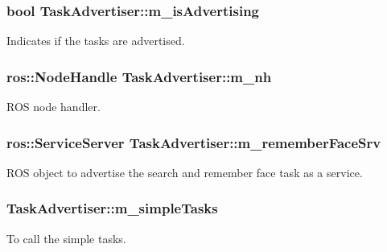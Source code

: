 \subsubsection[{\texorpdfstring{m\+\_\+is\+Advertising}{m_isAdvertising}}]{\setlength{\rightskip}{0pt plus 5cm}bool Task\+Advertiser\+::m\+\_\+is\+Advertising\hspace{0.3cm}{\ttfamily [private]}}\hypertarget{class_task_advertiser_a399c52352a5d0663074e03ad6ecae4c3}{}\label{class_task_advertiser_a399c52352a5d0663074e03ad6ecae4c3}
Indicates if the tasks are advertised. 
\subsubsection[{\texorpdfstring{m\+\_\+nh}{m_nh}}]{\setlength{\rightskip}{0pt plus 5cm}ros\+::\+Node\+Handle Task\+Advertiser\+::m\+\_\+nh\hspace{0.3cm}{\ttfamily [private]}}\hypertarget{class_task_advertiser_ac2b3e206897a243a661863c27fcf7e96}{}\label{class_task_advertiser_ac2b3e206897a243a661863c27fcf7e96}
R\+OS node handler. 
\subsubsection[{\texorpdfstring{m\+\_\+remember\+Face\+Srv}{m_rememberFaceSrv}}]{\setlength{\rightskip}{0pt plus 5cm}ros\+::\+Service\+Server Task\+Advertiser\+::m\+\_\+remember\+Face\+Srv\hspace{0.3cm}{\ttfamily [private]}}\hypertarget{class_task_advertiser_af4a9ec62d358dd0bfadc7f14ea56976c}{}\label{class_task_advertiser_af4a9ec62d358dd0bfadc7f14ea56976c}
R\+OS object to advertise the search and remember face task as a service. 
\subsubsection[{\texorpdfstring{m\+\_\+simple\+Tasks}{m_simpleTasks}}]{ Task\+Advertiser\+::m\+\_\+simple\+Tasks\hspace{0.3cm}{\ttfamily [private]}}\hypertarget{class_task_advertiser_acb092dd73221cb9c470e322e87530933}{}\label{class_task_advertiser_acb092dd73221cb9c470e322e87530933}
To call the simple tasks. 

